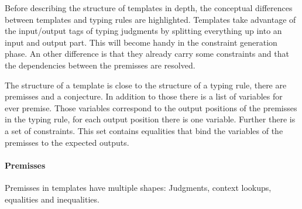 Before describing the structure of templates in depth, the conceptual
differences between templates and typing rules are highlighted.
Templates take advantage of the input/output tags of typing judgments
by splitting everything up into an input and output part. This will
become handy in the constraint generation phase. An other difference
is that they already carry some constraints and that the dependencies
between the premisses are resolved.

The structure of a template is close to the structure of a typing
rule, there are premisses and a conjecture. In addition to those there
is a list of variables for ever premise. Those variables correspond to
the output positions of the premisses in the typing rule, for each
output position there is one variable. Further there is a set of
constraints. This set contains equalities that bind the variables of
the premisses to the expected outputs.

\paragraph*{Premisses}
Premisses in templates have multiple shapes: Judgments, context
lookups, equalities and inequalities.

